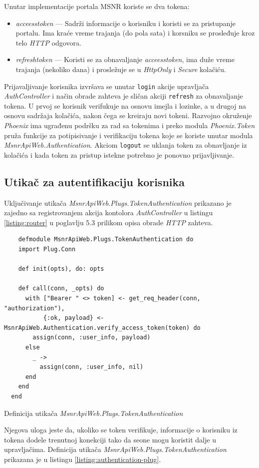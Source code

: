 \documentclass[12pt,oneside]{memoir}
\begin{document}
Unutar implementacije portala MSNR koriste se dva tokena: \begin{itemize}
\item \emph{acceess{\textunderscore}token} --- Sadrži informacije o korisniku i koristi se za pristupanje portalu. Ima kraće vreme trajanja (do pola sata) i korsniku se prosleđuje kroz telo \emph{HTTP} odgovora.
\item \emph{refresh{\textunderscore}token} --- Koristi se za obnavaljanje \emph{acceess{\textunderscore}token}, ima duže vreme trajanja (nekoliko dana) i prosležuje se u \emph{HttpOnly} i \emph{Secure} kolačiću.  
\end{itemize}

Prijavaljivanje korisnika izvršava se unutar \texttt{login} akcije upravljača \emph{AuthController} i
način obrade zahteva je sličan akciji \texttt{refresh} za obnavaljanje tokena. U prvoj se
korisnik verifukuje na osnovu imejla i lozinke, a u drugoj na osnovu sadržaja kolačića, nakon čega se kreiraju novi tokeni.
Razvojno okruženje \emph{Phoenix} ima ugrađenu podršku za rad sa tokenima i preko modula \emph{Phoenix.Token}
pruža funkcije za potipisivanje i verifikaciju tokena koje se koriste unutar modula \emph{MsnrApiWeb.Authentication}.
Akciom \texttt{logout} se uklanja token za obnavljanje iz kolačića i kada token za pristup istekne potrebno je ponovno prijavljivanje. 

\subsection{Utikač za autentifikaciju korisnika}
Uključivanje utikača \emph{MsnrApiWeb.Plugs.TokenAuthentication} prikazano je zajedno sa registrovanjem akcija kontolora
\emph{AuthController} u listingu \ref{listing:router} u poglavlju 5.3 prilikom opisa obrade \emph{HTTP} zahteva.
\begin{listing}[h!]
  \begin{verbatim}
    defmodule MsnrApiWeb.Plugs.TokenAuthentication do
    import Plug.Conn
  
    def init(opts), do: opts
  
    def call(conn, _opts) do
      with ["Bearer " <> token] <- get_req_header(conn, "authorization"),
           {:ok, payload} <- MsnrApiWeb.Authentication.verify_access_token(token) do
        assign(conn, :user_info, payload)
      else
        _ ->
          assign(conn, :user_info, nil)
      end
    end
  end
\end{verbatim}
\caption{Definicija utikača \emph{MsnrApiWeb.Plugs.TokenAuthentication}}
\label{listing:authentication-plug}
\end{listing}
Njegova uloga jeste da, ukoliko se token verifikuje, informacije o korisniku iz tokena dodele trenutnoj konekciji tako
da seone mogu koristit dalje u upravljačima. Definicija utikača \emph{MsnrApiWeb.Plugs.TokenAuthentication} prikazana je u
listingu \ref{listing:authentication-plug}.
\end{document}
